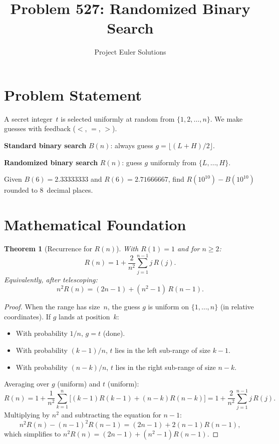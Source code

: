 \documentclass[11pt]{article}
\title{Problem 527: Randomized Binary Search}
\author{Project Euler Solutions}
\date{}
\newtheorem{theorem}{Theorem}
\begin{document}
\maketitle

\section{Problem Statement}
A secret integer~$t$ is selected uniformly at random from $\{1, 2, \ldots, n\}$. We make guesses with feedback ($<$, $=$, $>$).

\textbf{Standard binary search} $B(n)$: always guess $g = \lfloor(L+H)/2\rfloor$.

\textbf{Randomized binary search} $R(n)$: guess $g$ uniformly from $\{L,\ldots,H\}$.

Given $B(6) = 2.33333333$ and $R(6) = 2.71666667$, find $R(10^{10}) - B(10^{10})$ rounded to 8~decimal places.

\section{Mathematical Foundation}

\begin{theorem}[Recurrence for $R(n)$]
With $R(1) = 1$ and for $n \ge 2$:
\[
R(n) = 1 + \frac{2}{n^2}\sum_{j=1}^{n-1} j\,R(j).
\]
Equivalently, after telescoping:
\[
n^2 R(n) = (2n-1) + (n^2-1)\,R(n-1).
\]
\end{theorem}

\begin{proof}
When the range has size~$n$, the guess $g$ is uniform on $\{1,\ldots,n\}$ (in relative coordinates). If $g$ lands at position~$k$:
\begin{itemize}
    \item With probability $1/n$, $g = t$ (done).
    \item With probability $(k-1)/n$, $t$ lies in the left sub-range of size $k-1$.
    \item With probability $(n-k)/n$, $t$ lies in the right sub-range of size $n-k$.
\end{itemize}
Averaging over $g$ (uniform) and $t$ (uniform):
\[
R(n) = 1 + \frac{1}{n^2}\sum_{k=1}^{n}\bigl[(k-1)R(k-1)+(n-k)R(n-k)\bigr] = 1 + \frac{2}{n^2}\sum_{j=1}^{n-1}j\,R(j).
\]
Multiplying by $n^2$ and subtracting the equation for $n-1$:
\[
n^2 R(n) - (n-1)^2 R(n-1) = (2n-1) + 2(n-1)R(n-1),
\]
which simplifies to $n^2 R(n) = (2n-1) + (n^2-1)R(n-1)$.
\end{proof}
\end{document}
